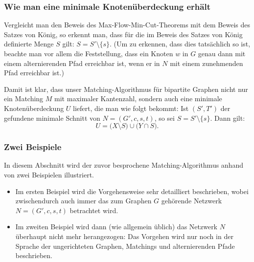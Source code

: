 \documentclass[smaller]{beamer}
\begin{document}
\begin{frame}
 \frametitle{Wie man eine minimale Knotenüberdeckung erhält}
 Vergleicht man den Beweis des Max-Flow-Min-Cut-Theorems mit dem Beweis des Satzes von König, so erkennt man, dass für die im Beweis des Satzes von König definierte Menge $S$ gilt: $S = S' \setminus \big\{ s \big\}$. (Um zu erkennen, dass dies tatsächlich so ist, beachte man vor allem die Feststellung, dass ein Knoten $w$ in $G$ genau dann mit einem alternierenden Pfad erreichbar ist, wenn er in $N$ mit einem zunehmenden Pfad erreichbar ist.) \\ \vspace*{0.2cm}

\alert{Damit ist klar, dass unser Matching-Algorithmus für bipartite Graphen nicht nur ein Matching  $M$ mit maximaler Kantenzahl, sondern auch eine minimale Knotenüberdeckung $U$ liefert, die man wie folgt bekommt}: Ist $(S',T')$ der gefundene minimale Schnitt von $N=(G',c,s,t)$, so sei $S = S' \setminus \big\{ s \big\}$. Dann gilt:
\begin{equation*}
U = \big( X \setminus S \big) \cup \big( Y \cap S \big).
\end{equation*}
\end{frame}

\begin{frame}
 \frametitle{Zwei Beispiele}
 In diesem Abschnitt wird der zuvor besprochene Matching-Algorithmus anhand von zwei Beispielen illustriert. 
 \begin{itemize}
 \item Im ersten Beispiel wird die Vorgehensweise sehr detailliert beschrieben, wobei zwischendurch auch immer das zum Graphen $G$ gehörende Netzwerk $N=(G',c,s,t)$ betrachtet wird.
 \item Im zweiten Beispiel wird dann (wie allgemein üblich) das Netzwerk $N$ überhaupt nicht mehr herangezogen: \alert{Das Vorgehen wird nur noch in der Sprache der ungerichteten Graphen, Matchings und alternierenden Pfade beschrieben.}
 \end{itemize}
\end{frame}
\end{document}
